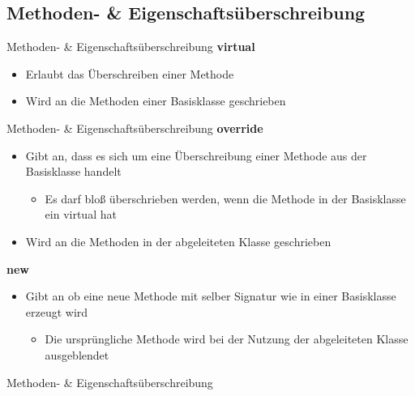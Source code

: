\subsection{Methoden- \& Eigenschaftsüberschreibung}
\begin{frame}{Methoden- \& Eigenschaftsüberschreibung}	
	\textbf{virtual}\\
	\begin{itemize}
		\item Erlaubt das Überschreiben einer Methode
		\item Wird an die Methoden einer Basisklasse geschrieben
	\end{itemize}
	
\end{frame}

\begin{frame}{Methoden- \& Eigenschaftsüberschreibung}	
	\textbf{override}\\
	\begin{itemize}
		\item Gibt an, dass es sich um eine Überschreibung einer Methode aus der Basisklasse handelt
		\begin{itemize}
			\item Es darf bloß überschrieben werden, wenn die Methode in der Basisklasse ein \alert{virtual} hat
		\end{itemize}
		\item Wird an die Methoden in der abgeleiteten Klasse geschrieben
	\end{itemize}
	\textbf{new}\\
	\begin{itemize}
		\item Gibt an ob eine neue Methode mit selber Signatur wie in einer Basisklasse erzeugt wird
		\begin{itemize}
			\item Die ursprüngliche Methode wird bei der Nutzung der abgeleiteten Klasse ausgeblendet
		\end{itemize}
	\end{itemize}
\end{frame}

\begin{frame}{Methoden- \& Eigenschaftsüberschreibung}
	
\end{frame}

